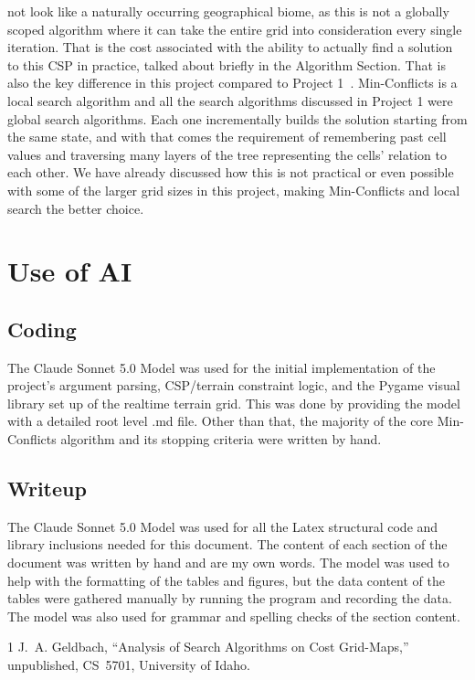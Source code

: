 \documentclass[conference]{IEEEtran}
\begin{document}
not look like a naturally occurring geographical biome, as this is not a globally scoped algorithm where it can take the entire grid into consideration every single iteration. That is the cost associated with the ability to actually find a solution to this CSP in practice, talked about briefly in the Algorithm Section. That is also the key difference in this project compared to Project 1~\cite{project1}. Min-Conflicts is a local search algorithm and all the search algorithms discussed in Project 1 were global search algorithms. Each one incrementally builds the solution starting from the same state, and with that comes the requirement of remembering past cell values and traversing many layers of the tree representing the cells' relation to each other. We have already discussed how this is not practical or even possible with some of the larger grid sizes in this project, making Min-Conflicts and local search the better choice.


\section*{Use of AI}

\subsection*{Coding}
The Claude Sonnet 5.0 Model was used for the initial implementation of the project's argument parsing, CSP/terrain constraint logic, and the Pygame visual library set up of the realtime terrain grid. This was done by providing the model with a detailed root level .md file. Other than that, the majority of the core Min-Conflicts algorithm and its stopping criteria were written by hand.



\subsection*{Writeup}
The Claude Sonnet 5.0 Model was used for all the Latex structural code and library inclusions needed for this document. The content of each section of the document was written by hand and are my own words. The model was used to help with the formatting of the tables and figures, but the data content of the tables were gathered manually by running the program and recording the data. The model was also used for grammar and spelling checks of the section content.


\begin{thebibliography}{1}
J.~A. Geldbach, ``Analysis of Search Algorithms on Cost Grid-Maps,'' unpublished, CS~5701, University of Idaho.
\end{thebibliography}
\end{document}
